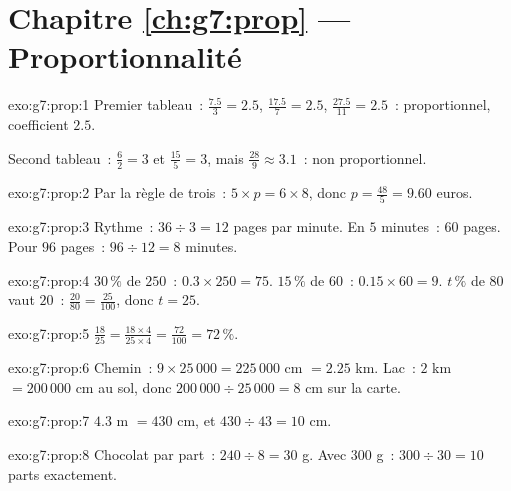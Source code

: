 \section*{Chapitre \ref{ch:g7:prop} --- Proportionnalité}

\begin{solution}{exo:g7:prop:1}
Premier tableau~:  $\frac{7.5}{3} = 2.5$,
$\frac{17.5}{7} = 2.5$, $\frac{27.5}{11} = 2.5$~: proportionnel,
coefficient $2.5$.

Second tableau~: $\frac62 = 3$ et $\frac{15}{5} = 3$, mais
$\frac{28}{9} \approx 3.1$~: non proportionnel.
\end{solution}

\begin{solution}{exo:g7:prop:2}
Par la règle de trois~: $5 \times p = 6 \times 8$, donc
$p = \frac{48}{5} = 9.60$ euros.
\end{solution}

\begin{solution}{exo:g7:prop:3}
Rythme~: $36 \div 3 = 12$ pages par minute. En $5$ minutes~:
$60$ pages. Pour $96$ pages~: $96 \div 12 = 8$ minutes.
\end{solution}

\begin{solution}{exo:g7:prop:4}
$30\,\%$ de $250$~: $0.3 \times 250 = 75$. \quad
$15\,\%$ de $60$~: $0.15 \times 60 = 9$. \quad
$t\,\%$ de $80$ vaut $20$~: $\frac{20}{80} = \frac{25}{100}$, donc
$t = 25$.
\end{solution}

\begin{solution}{exo:g7:prop:5}
$\frac{18}{25} = \frac{18 \times 4}{25 \times 4} = \frac{72}{100} =
72\,\%$.
\end{solution}

\begin{solution}{exo:g7:prop:6}
Chemin~: $9 \times 25\,000 = 225\,000$ cm $= 2.25$ km.
Lac~: $2$ km $= 200\,000$ cm au sol, donc
$200\,000 \div 25\,000 = 8$ cm sur la carte.
\end{solution}

\begin{solution}{exo:g7:prop:7}
$4.3$ m $= 430$ cm, et $430 \div 43 = 10$ cm.
\end{solution}

\begin{solution}{exo:g7:prop:8}
Chocolat par part~: $240 \div 8 = 30$ g. Avec $300$ g~:
$300 \div 30 = 10$ parts exactement.
\end{solution}

